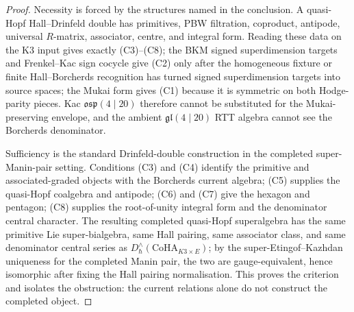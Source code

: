 \begin{proof}
Necessity is forced by the structures named in the conclusion.
A quasi-Hopf Hall--Drinfeld double has primitives, PBW filtration,
coproduct, antipode, universal \(R\)-matrix, associator, centre, and
integral form. Reading these data on the K3 input gives exactly
\textup{(C3)}--\textup{(C8)}; the BKM signed superdimension targets and
Frenkel--Kac sign cocycle give \textup{(C2)} only after the homogeneous
fixture or finite Hall--Borcherds recognition has turned signed
superdimension targets into source spaces; the Mukai form gives
\textup{(C1)} because it is symmetric on both Hodge-parity pieces.
Kac $\mathfrak{osp}(4\mid20)$ therefore cannot be substituted for the
Mukai-preserving envelope, and the ambient $\mathfrak{gl}(4\mid20)$
RTT algebra cannot see the Borcherds denominator.

Sufficiency is the standard Drinfeld-double construction in the
completed super-Manin-pair setting. Conditions \textup{(C3)} and
\textup{(C4)} identify the primitive and associated-graded objects with
the Borcherds current algebra; \textup{(C5)} supplies the quasi-Hopf
coalgebra and antipode; \textup{(C6)} and \textup{(C7)} give the
hexagon and pentagon; \textup{(C8)} supplies the root-of-unity integral
form and the denominator central character. The resulting completed
quasi-Hopf superalgebra has the same primitive Lie super-bialgebra,
same Hall pairing, same associator class, and same denominator central
series as $D^\wedge_\hbar(\mathrm{CoHA}_{K3\times E})$; by the
super-Etingof--Kazhdan uniqueness for the completed Manin pair, the two
are gauge-equivalent, hence isomorphic after fixing the Hall pairing
normalisation. This proves the criterion and isolates the obstruction:
the current relations alone do not construct the completed object.
\end{proof}

